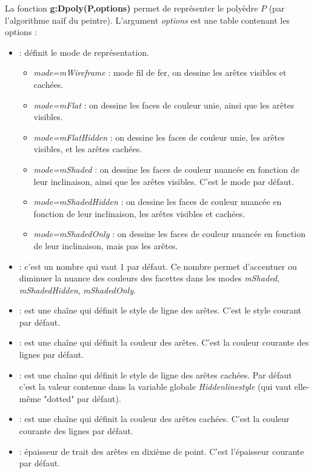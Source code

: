 La fonction \textbf{g:Dpoly(P,options)} permet de représenter le polyèdre $P$ (par l'algorithme naïf du peintre). L'argument \emph{options} est une table contenant les options :
\begin{itemize}
    \item {} : définit le mode de représentation.
        \begin{itemize}
            \item \emph{mode=mWireframe} : mode fil de fer, on dessine les arêtes visibles et cachées.
            \item \emph{mode=mFlat} : on dessine les faces de couleur unie, ainsi que les arêtes visibles.
            \item \emph{mode=mFlatHidden} : on dessine les faces de couleur unie, les arêtes visibles, et les arêtes cachées.
            \item \emph{mode=mShaded} : on dessine les faces de couleur nuancée en fonction de leur inclinaison, ainsi que les arêtes visibles. C'est le mode par défaut.
            \item \emph{mode=mShadedHidden} : on dessine les faces de couleur nuancée en fonction de leur inclinaison, les arêtes visibles et cachées.
            \item \emph{mode=mShadedOnly} :  on dessine les faces de couleur nuancée en fonction de leur inclinaison, mais pas les arêtes.
        \end{itemize}
        \item {} : c'est un nombre qui vaut 1 par défaut. Ce nombre permet d'accentuer ou diminuer la nuance des couleurs des facettes dans les modes \emph{mShaded}, \emph{mShadedHidden}, \emph{mShadedOnly}.
        \item {} : est une chaîne qui définit le style de ligne des arêtes. C'est le style courant par défaut.
        \item {} : est une chaîne qui définit la couleur des arêtes. C'est la couleur courante des lignes par défaut.
        \item {} : est une chaîne qui définit le style de ligne des arêtes cachées. Par défaut c'est la valeur contenue dans la variable globale \emph{Hiddenlinestyle} (qui vaut elle-même "dotted" par défaut).
        \item {} : est une chaîne qui définit la couleur des arêtes cachées. C'est la couleur courante des lignes par défaut.
        \item {} : épaisseur de trait des arêtes en dixième de point. C'est l'épaisseur courante par défaut.

\end{itemize}
